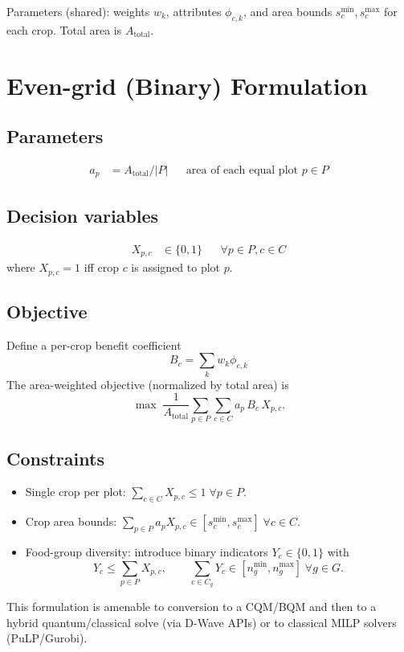 \documentclass[11pt,a4paper]{article}
\begin{document}
Parameters (shared): weights $w_k$, attributes $\phi_{c,k}$, and area bounds $s_c^{\min}, s_c^{\max}$ for each crop. Total area is $A_{\text{total}}$.

\section{Even-grid (Binary) Formulation}

\subsection{Parameters}
\begin{align}
    a_p &= A_{\text{total}}/|P| && \text{area of each equal plot } p \in P
\end{align}

\subsection{Decision variables}
\begin{align}
    X_{p,c} &\in \{0,1\} && \forall p \in P, c \in C
\end{align}
where $X_{p,c}=1$ iff crop $c$ is assigned to plot $p$.

\subsection{Objective}
Define a per-crop benefit coefficient
\[ B_c = \sum_k w_k \phi_{c,k} \]
The area-weighted objective (normalized by total area) is
\[ \max \; \frac{1}{A_{\text{total}}} \sum_{p\in P} \sum_{c\in C} a_p \, B_c \, X_{p,c}. \]

\subsection{Constraints}
\begin{itemize}
    \item Single crop per plot: $\sum_{c\in C} X_{p,c} \le 1 \; \forall p\in P$.
    \item Crop area bounds: $\sum_{p\in P} a_p X_{p,c} \in [s_c^{\min}, s_c^{\max}] \; \forall c\in C$.
    \item Food-group diversity: introduce binary indicators $Y_c \in\{0,1\}$ with
        \[ Y_c \le \sum_{p\in P} X_{p,c}, \qquad \sum_{c\in C_g} Y_c \in [n_g^{\min}, n_g^{\max}] \; \forall g\in G. \]
\end{itemize}

This formulation is amenable to conversion to a CQM/BQM and then to a hybrid quantum/classical solve (via D-Wave APIs) or to classical MILP solvers (PuLP/Gurobi).
\end{document}
